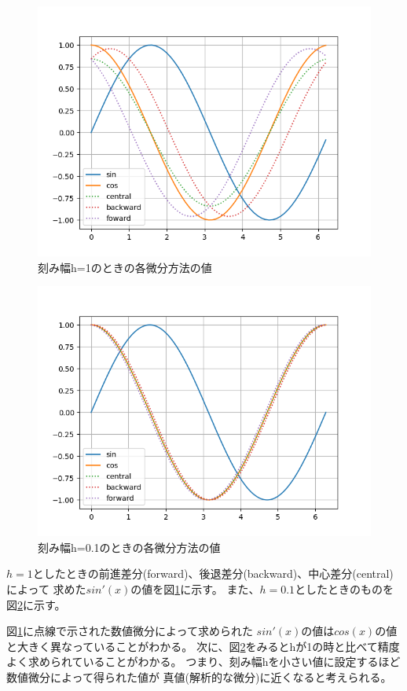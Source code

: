 \documentclass[dvipdfmx]{jsarticle}
\begin{document}
\begin{figure}[htbp]
  \centering
  \includegraphics[width=0.7\hsize]{../pics/h=1.png}
  \caption{刻み幅h=1のときの各微分方法の値}
  \label{fig:h_1}
\end{figure}

\begin{figure}[htbp]
  \centering
  \includegraphics[width=0.7\hsize]{../pics/h=0_1.png}
  \caption{刻み幅h=0.1のときの各微分方法の値}
  \label{fig:h_01}
\end{figure}

$h=1$としたときの前進差分(forward)、後退差分(backward)、中心差分(central)によって
求めた$sin'(x)$の値を図\ref{fig:h_1}に示す。
また、$h=0.1$としたときのものを図\ref{fig:h_01}に示す。

図\ref{fig:h_1}に点線で示された数値微分によって求められた
$sin'(x)$の値は$cos(x)$の値と大きく異なっていることがわかる。
次に、図\ref{fig:h_01}をみるとhが1の時と比べて精度よく求められていることがわかる。
つまり、刻み幅hを小さい値に設定するほど数値微分によって得られた値が
真値(解析的な微分)に近くなると考えられる。
\end{document}
